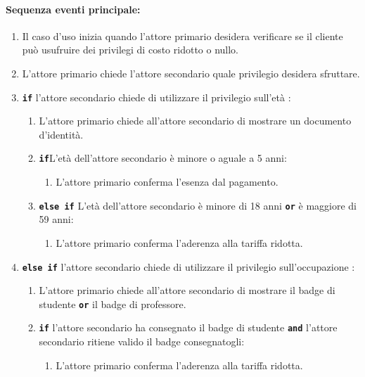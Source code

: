 \documentclass{article}
\begin{document}
	\paragraph{Sequenza eventi principale:}
\begin{enumerate}[itemsep=8pt,parsep=0pt]

    \item Il caso d'uso inizia quando l'attore primario desidera verificare se il cliente può usufruire dei privilegi di costo ridotto o nullo.

	\item L'attore primario chiede l'attore secondario quale privilegio desidera sfruttare.
    
    \item   \texttt{\textbf{if}} l'attore secondario chiede di utilizzare il privilegio sull'età :
        \begin{enumerate}[itemsep=8pt,parsep=0pt]
		\item L'attore primario chiede all'attore secondario di mostrare un documento d'identità.
			\item   \texttt{\textbf{if}}L'età dell'attore secondario è minore o aguale a 5 anni: 
			        \begin{enumerate}[itemsep=8pt,parsep=0pt]
						\item L'attore primario conferma l'esenza dal pagamento.
					\end{enumerate}

			\item   \texttt{\textbf{else if}} L'età dell'attore secondario è minore di 18 anni \texttt{\textbf{or}} è maggiore di 59 anni:
			        \begin{enumerate}[itemsep=8pt,parsep=0pt]
						\item L'attore primario conferma l'aderenza alla tariffa ridotta.
					\end{enumerate}
        \end{enumerate}

    \item   \texttt{\textbf{else if}} l'attore secondario chiede di utilizzare il privilegio sull'occupazione :
        \begin{enumerate}[itemsep=8pt,parsep=0pt]
		\item L'attore primario chiede all'attore secondario di mostrare il badge di studente \texttt{\textbf{or}} il badge di professore.
			\item   \texttt{\textbf{if}} l'attore secondario ha consegnato il badge di studente \texttt{\textbf{and}} l'attore secondario ritiene valido il badge consegnatogli:
			        \begin{enumerate}[itemsep=8pt,parsep=0pt]
						\item L'attore primario conferma l'aderenza alla tariffa ridotta.
					\end{enumerate}


\end{enumerate}
\end{enumerate}
\end{document}
